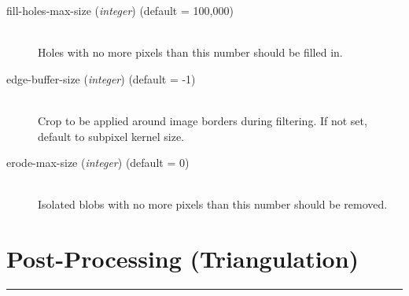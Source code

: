 \begin{description}
\item[fill-holes-max-size \textnormal{\small{(\emph{integer})}} (default = 100,000)] \hfill \\
  Holes with no more pixels than this number should be filled in.
\item[edge-buffer-size \textnormal{\small{(\emph{integer})}} (default = -1)] \hfill \\
  Crop to be applied around image borders during filtering.  If not set, default to subpixel kernel size.
\item[erode-max-size \textnormal{\small{(\emph{integer})}} (default = 0)] \hfill \\
  Isolated blobs with no more pixels than this number should be removed.

\end{description}


\section{Post-Processing (Triangulation)}
\label{triangulation_options}
\hrule
\bigskip


